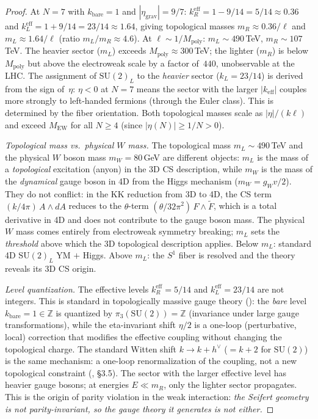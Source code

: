 \begin{proof}
At $N = 7$ with $k_{\mathrm{bare}} = 1$ and
$|\eta_{\mathrm{grav}}| = 9/7$:
$k_R^{\mathrm{eff}} = 1 - 9/14 = 5/14 \approx 0.36$
and $k_L^{\mathrm{eff}} = 1 + 9/14 = 23/14 \approx 1.64$,
giving topological masses
$m_R \approx 0.36/\ell$ and $m_L \approx 1.64/\ell$
(ratio $m_L/m_R \approx 4.6$).
At $\ell \sim 1/M_{\mathrm{poly}}$:
$m_L \sim 490$\,TeV, $m_R \sim 107$\,TeV.
The heavier sector ($m_L$) exceeds
$M_{\mathrm{poly}} \approx 300$\,TeV;
the lighter ($m_R$) is below $M_{\mathrm{poly}}$ but
above the electroweak scale by a factor of~$440$,
unobservable at the LHC.
The assignment of $\mathrm{SU}(2)_L$ to the
\emph{heavier} sector ($k_L = 23/14$)%
\label{assignment:SU2L}%
is derived from the
sign of~$\eta$: $\eta < 0$ at $N = 7$ means the sector
with the larger $|k_{\mathrm{eff}}|$ couples more strongly
to left-handed fermions (through the Euler class).
This is determined by the fiber orientation.
Both topological masses scale as $|\eta|/(k\ell)$
and exceed $M_{\mathrm{EW}}$ for all $N \ge 4$
(since $|\eta(N)| \ge 1/N > 0$).

\emph{Topological mass vs.\ physical $W$ mass.}
The topological mass $m_L \sim 490$\,TeV and the physical
$W$ boson mass $m_W = 80$\,GeV are different objects:
$m_L$ is the mass of a \emph{topological} excitation
(anyon) in the 3D CS description, while $m_W$ is the
mass of the \emph{dynamical} gauge boson in 4D from the
Higgs mechanism ($m_W = g_W v/2$).
They do not conflict: in the KK reduction from 3D to 4D,
the CS term $(k/4\pi)\,A \wedge dA$ reduces to the
$\theta$-term $(\theta/32\pi^2)\,F \wedge \tilde{F}$,
which is a total derivative in 4D and does not contribute
to the gauge boson mass.
The physical $W$ mass comes entirely from electroweak
symmetry breaking; $m_L$ sets the \emph{threshold}
above which the 3D topological description applies.
Below $m_L$: standard 4D $\mathrm{SU}(2)_L$ YM $+$ Higgs.
Above $m_L$: the $S^1$ fiber is resolved and the
theory reveals its 3D CS origin.

\emph{Level quantization.}
The effective levels $k_R^{\mathrm{eff}} = 5/14$
and $k_L^{\mathrm{eff}} = 23/14$ are not integers.
This is standard in topologically massive gauge theory
(\citealt{DeserJackiwTempleton1982}):
the \emph{bare} level $k_{\mathrm{bare}} = 1 \in \mathbb{Z}$
is quantized by $\pi_3(\mathrm{SU}(2)) = \mathbb{Z}$
(invariance under large gauge transformations),
while the eta-invariant shift $\eta/2$ is a one-loop
(perturbative, local) correction that modifies the
effective coupling without changing the topological charge.
The standard Witten shift $k \to k + h^\vee$ ($= k + 2$
for $\mathrm{SU}(2)$) is the same mechanism: a one-loop
renormalization of the coupling, not a new topological
constraint
(\citealt{Dunne1999}, \S3.5).
The sector with the larger effective level has heavier
gauge bosons; at energies $E \ll m_R$, only the
lighter sector propagates.
This is the origin of parity violation in the weak interaction:
\emph{the Seifert geometry is not parity-invariant, so the
gauge theory it generates is not either.}
\end{proof}

